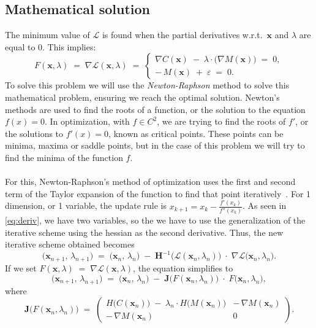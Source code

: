 \documentclass[12pt]{extarticle}
\numberwithin{equation}{section}
\begin{document}
\subsection{Mathematical solution}
The minimum value of $\mathcal{L}$ is found when the partial derivatives 
w.r.t.\ $\mathbf{x}$ and $\lambda$ are equal to 0. This implies:
\begin{equation}\label{eq:deriv}
F(\mathbf{x}, \lambda) \;=\; \nabla \mathcal{L}(\mathbf{x}, \lambda) \;=\;
\begin{cases}
\nabla C(\mathbf{x}) \;-\;\lambda \cdot \bigl(\nabla M(\mathbf{x})\bigr) \;=\; 0, \\
-\,M(\mathbf{x})\;+\;\varepsilon\;=\;0.
\end{cases}
\end{equation}
To solve this problem we will use the \emph{Newton-Raphson} method to solve this mathematical problem, ensuring we reach the optimal solution. Newton's methods are used to find the roots of a function, or the solution to the equation $f(x) = 0$. In optimization, with $f \in C^2$, we are trying to find the roots of $f'$, or the solutions to $f'(x) = 0$, known as critical points. These points can be minima, maxima or saddle points, but in the case of this problem we will try to find the minima of the function $f$. \\
\\
For this, Newton-Raphson’s method of optimization uses the first and second term of the Taylor expansion of the function to find that point iteratively~\cite{fliege2009newton}. For 1 dimension, or 1 variable, the update rule is $x_{k+1}=x_{k}-{\frac {f'(x_{k})}{f''(x_{k})}}$. As seen in \eqref{eq:deriv}, we have two variables, so the we have to use the generalization of the iterative scheme using the hessian as the second derivative. Thus, the new iterative scheme obtained becomes
\[
\bigl(\mathbf{x}_{n+1},\,\lambda_{n+1}\bigr)
\;=\;
\bigl(\mathbf{x}_n,\,\lambda_n\bigr)
\;-\;
\mathbf{H}^{-1}\!\bigl(\mathcal{L}(\mathbf{x}_n,\lambda_n)\bigr)
\;\cdot\;
\nabla\mathcal{L}\bigl(\mathbf{x}_n,\lambda_n\bigr).
\]
If we set $F(\mathbf{x},\lambda) \;=\;\nabla \mathcal{L}(\mathbf{x},\lambda)$, 
the equation simplifies to
\[
\bigl(\mathbf{x}_{n+1},\,\lambda_{n+1}\bigr)
\;=\;
\bigl(\mathbf{x}_n,\,\lambda_n\bigr)
\;-\;
\mathbf{J}\!\bigl(F(\mathbf{x}_n,\lambda_n)\bigr)
\;\cdot\;
F\!\bigl(\mathbf{x}_n,\lambda_n\bigr),
\]
where
\[
\mathbf{J}\!\bigl(F(\mathbf{x}_n,\lambda_n)\bigr)
\;=\;
\begin{pmatrix}
H\!\bigl(C(\mathbf{x}_n)\bigr)\;-\;\lambda_n \cdot H\!\bigl(M(\mathbf{x}_n)\bigr) 
    & -\,\nabla M(\mathbf{x}_n)
\\[6pt]
-\,\nabla M(\mathbf{x}_n)
    & 0
\end{pmatrix}.
\]
\end{document}
